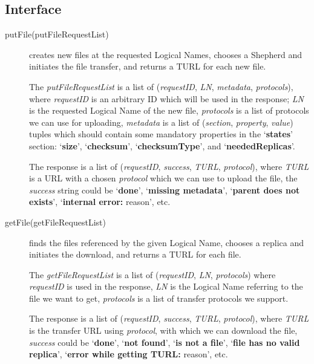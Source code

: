 \documentclass{book}
\begin{document}

\subsection{Interface} %

\begin{description}

    \item[putFile(putFileRequestList)] creates new files at the requested Logical Names, chooses a Shepherd and initiates the file transfer, and returns a TURL for each new file.
        
    The \emph{putFileRequestList} is a list of (\emph{requestID}, \emph{LN}, \emph{metadata}, \emph{protocols}), where \emph{requestID} is an arbitrary ID which will be used in the response; \emph{LN} is the requested Logical Name of the new file, \emph{protocols} is a list of protocols we can use for uploading, \emph{metadata} is a list of (\emph{section}, \emph{property}, \emph{value}) tuples which should contain some mandatory properties in the `\textbf{states}' section: `\textbf{size}', `\textbf{checksum}', `\textbf{checksumType}', and  `\textbf{neededReplicas}'. 

    The response is a list of (\emph{requestID}, \emph{success}, \emph{TURL}, \emph{protocol}), where \emph{TURL} is a URL with a chosen \emph{protocol} which we can use to upload the file, the \emph{success} string could be `\textbf{done}', `\textbf{missing metadata}', `\textbf{parent does not exists}', `\textbf{internal error:} reason', etc.

    \item[getFile(getFileRequestList)] finds the files referenced by the given Logical Name, chooses a replica and initiates the download, and returns a TURL for each file.
    
    The \emph{getFileRequestList} is a list of (\emph{requestID}, \emph{LN}, \emph{protocols}) where \emph{requestID} is used in the response, \emph{LN} is the Logical Name referring to the file we want to get, \emph{protocols} is a list of transfer protocols we support.
    
    The response is a list of (\emph{requestID}, \emph{success}, \emph{TURL}, \emph{protocol}), where \emph{TURL} is the transfer URL using \emph{protocol}, with which we can download the file, \emph{success} could be `\textbf{done}', `\textbf{not found}', `\textbf{is not a file}', `\textbf{file has no valid replica}', `\textbf{error while getting TURL:} reason', etc.


\end{description}
\end{document}
